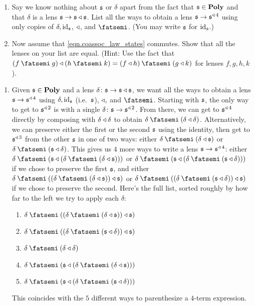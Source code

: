 \documentclass[Book-Poly]{subfiles}
\begin{document}
\begin{exercise}
\begin{enumerate}
    \item Say we know nothing about $\mathfrak{s}$ or $\delta$ apart from the fact that $\mathfrak{s}\in\mathbf{Poly}$ and that $\delta$ is a lens $\mathfrak{s}\to\mathfrak{s}\mathbin{\triangleleft}\mathfrak{s}$.
    List all the ways to obtain a lens $\mathfrak{s}\to\mathfrak{s}^{\mathbin{\triangleleft}\,4}$ using only copies of $\delta,\mathrm{id}_{\mathfrak{s}}$, $\mathbin{\triangleleft}$, and $\then$.
    (You may write $\mathfrak{s}$ for $\mathrm{id}_{\mathfrak{s}}$.)

    \item Now assume that \eqref{eqn.coassoc_law_states} commutes.
    Show that all the lenses on your list are equal.
    (Hint: Use the fact that $(f\then g)\tri(h\then k)=(f\tri h)\then(g\tri k)$ for lenses $f,g,h,k$).
    \qedhere
\end{enumerate}
\begin{solution}
\begin{enumerate}
    \item Given $\mathfrak{s}\in\mathbf{Poly}$ and a lens $\delta\colon\mathfrak{s}\to\mathfrak{s}\mathbin{\triangleleft}\mathfrak{s}$, we want all the ways to obtain a lens $\mathfrak{s}\to\mathfrak{s}^{\mathbin{\triangleleft}\,4}$ using $\delta,\mathrm{id}_{\mathfrak{s}}$ (i.e.\ $\mathfrak{s}$), $\mathbin{\triangleleft},$ and $\then$.
    Starting with $\mathfrak{s}$, the only way to get to $\mathfrak{s}^{\mathbin{\triangleleft}\,2}$ is with a single $\delta\colon\mathfrak{s}\to\mathfrak{s}^{\mathbin{\triangleleft}\,2}$.
    From there, we can get to $\mathfrak{s}^{\mathbin{\triangleleft}\,4}$ directly by composing with $\delta\mathbin{\triangleleft}\delta$ to obtain $\delta\then(\delta\tri\delta)$.
    Alternatively, we can preserve either the first or the second $\mathfrak{s}$ using the identity, then get to $\mathfrak{s}^{\mathbin{\triangleleft}\,3}$ from the other $\mathfrak{s}$ in one of two ways: either $\delta\then(\delta\tri\ema{s})$ or $\delta\then(\ema{s}\tri\delta)$.
    This gives us $4$ more ways to write a lens $\mathfrak{s}\to\mathfrak{s}^{\mathbin{\triangleleft}\,4}$: either $\delta\then(\ema{s}\tri(\delta\then(\delta\tri\ema{s})))$ or $\delta\then(\ema{s}\tri(\delta\then(\ema{s}\tri\delta)))$ if we chose to preserve the first $\mathfrak{s}$, and either $\delta\then((\delta\then(\delta\tri\ema{s}))\tri\ema{s})$ or $\delta\then((\delta\then(\ema{s}\tri\delta))\tri\ema{s})$ if we chose to preserve the second.
    Here's the full list, sorted roughly by how far to the left we try to apply each $\delta$:
    \begin{enumerate}[label=(\arabic*)]
        \item $\delta\then((\delta\then(\delta\tri\ema{s}))\tri\ema{s})$
        \item $\delta\then((\delta\then(\ema{s}\tri\delta))\tri\ema{s})$
        \item $\delta\then(\delta\tri\delta)$
        \item $\delta\then(\ema{s}\tri(\delta\then(\delta\tri\ema{s})))$
        \item $\delta\then(\ema{s}\tri(\delta\then(\ema{s}\tri\delta)))$
    \end{enumerate}
    This coincides with the $5$ different ways to parenthesize a $4$-term expression.
    

\end{enumerate}
\end{solution}
\end{exercise}
\end{document}
